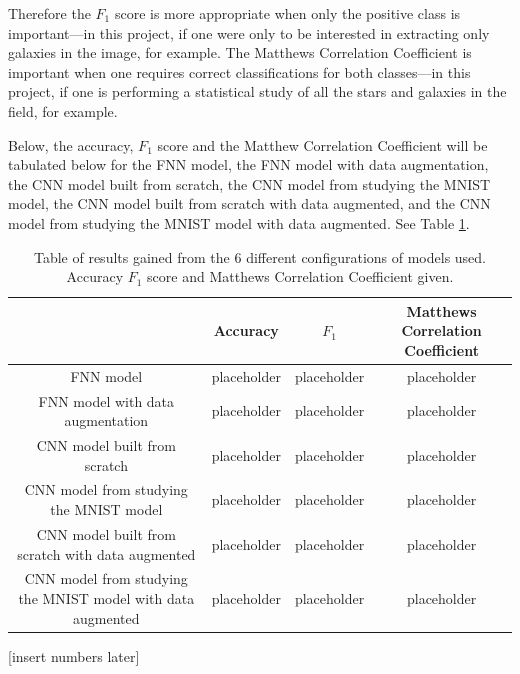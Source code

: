\documentclass[a4paper,fleqn,usenatbib]{mnras}
\begin{document}
Therefore the $F_1$ score is more appropriate when only the positive class is important---in this project, if one were only to be interested in extracting only galaxies in the image, for example. The Matthews Correlation Coefficient is important when one requires correct classifications for both classes---in this project, if one is performing a statistical study of all the stars and galaxies in the field, for example. 

Below, the accuracy, $F_1$ score and the Matthew Correlation Coefficient will be tabulated below for the FNN model, the FNN model with data augmentation, the CNN model built from scratch, the CNN model from studying the MNIST model, the CNN model built from scratch with data augmented, and the CNN model from studying the MNIST model with data augmented. See Table \ref{table:results}.


\begin{table}
 \begin{tabular}{c||c c c||} 
 \hline
  & Accuracy & $F_1$ & Matthews Correlation Coefficient \\ [0.5ex] 
 \hline\hline
 FNN model & placeholder & placeholder & placeholder \\ 
 \hline
 FNN model with data augmentation & placeholder & placeholder & placeholder \\
 \hline
 CNN model built from scratch & placeholder & placeholder & placeholder \\
 \hline
 CNN model from studying the MNIST model & placeholder & placeholder & placeholder \\
 \hline
  CNN model built from scratch with data augmented & placeholder & placeholder & placeholder \\
 \hline
 CNN model from studying the MNIST model with data augmented & placeholder & placeholder & placeholder \\
 \hline
\end{tabular}
\caption{Table of results gained from the 6 different configurations of models used. Accuracy $F_	1$ score and Matthews Correlation Coefficient given. \label{table:results}}
\end{table}
[insert numbers later]
\end{document}
